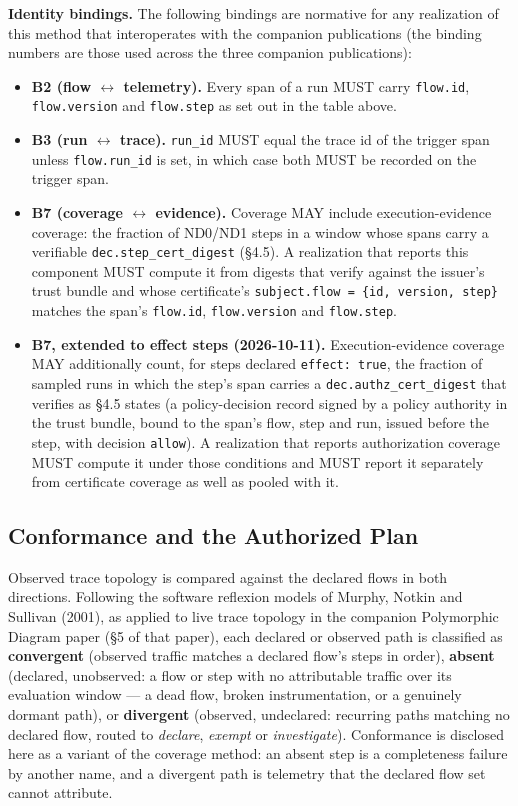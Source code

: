 \documentclass[11pt]{article}
\newcommand{\code}[1]{\texttt{#1}}
\begin{document}
\textbf{Identity bindings.} The following bindings are normative for any realization of this method that interoperates with the companion publications (the binding numbers are those used across the three companion publications):

\begin{itemize}
\item \textbf{B2 (flow \(\leftrightarrow\) telemetry).} Every span of a run MUST carry \code{flow.id}, \code{flow.version} and \code{flow.step} as set out in the table above.
\item \textbf{B3 (run \(\leftrightarrow\) trace).} \code{run\_id} MUST equal the trace id of the trigger span unless \code{flow.run\_id} is set, in which case both MUST be recorded on the trigger span.
\item \textbf{B7 (coverage \(\leftrightarrow\) evidence).} Coverage MAY include execution-evidence coverage: the fraction of ND0/ND1 steps in a window whose spans carry a verifiable \code{dec.step\_cert\_digest} (\S4.5). A realization that reports this component MUST compute it from digests that verify against the issuer's trust bundle and whose certificate's \code{subject.flow = \{id, version, step\}} matches the span's \code{flow.id}, \code{flow.version} and \code{flow.step}.
\item \textbf{B7, extended to effect steps (2026-10-11).} Execution-evidence coverage MAY additionally count, for steps declared \code{effect: true}, the fraction of sampled runs in which the step's span carries a \code{dec.authz\_cert\_digest} that verifies as \S4.5 states (a policy-decision record signed by a policy authority in the trust bundle, bound to the span's flow, step and run, issued before the step, with decision \code{allow}). A realization that reports authorization coverage MUST compute it under those conditions and MUST report it separately from certificate coverage as well as pooled with it.
\end{itemize}

\subsection{Conformance and the Authorized Plan}
Observed trace topology is compared against the declared flows in both directions. Following the software reflexion models of Murphy, Notkin and Sullivan (2001), as applied to live trace topology in the companion Polymorphic Diagram paper (\S5 of that paper), each declared or observed path is classified as \textbf{convergent} (observed traffic matches a declared flow's steps in order), \textbf{absent} (declared, unobserved: a flow or step with no attributable traffic over its evaluation window --- a dead flow, broken instrumentation, or a genuinely dormant path), or \textbf{divergent} (observed, undeclared: recurring paths matching no declared flow, routed to \emph{declare}, \emph{exempt} or \emph{investigate}). Conformance is disclosed here as a variant of the coverage method: an absent step is a completeness failure by another name, and a divergent path is telemetry that the declared flow set cannot attribute.
\end{document}
